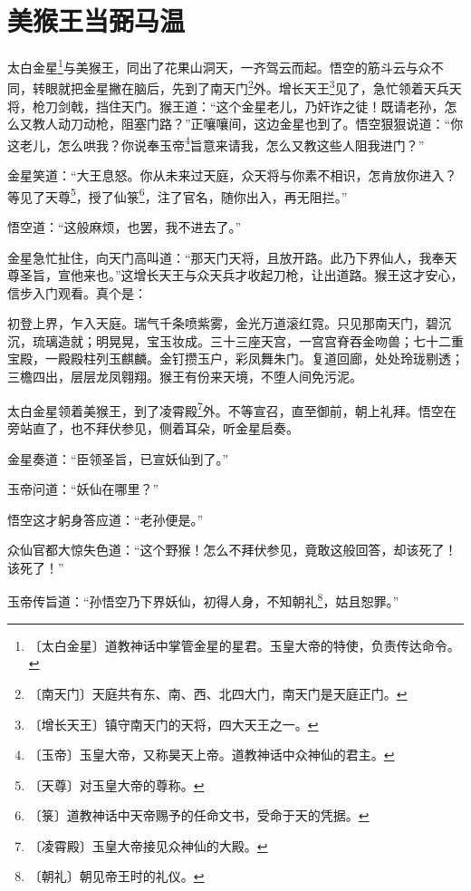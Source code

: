 \documentclass[12pt,UTF-8,openany]{ctexbook}
\begin{document}
\chapter{美猴王当弼马温}

\begin{large}
    
    太白金星\footnote{〔太白金星〕道教神话中掌管金星的星君。玉皇大帝的特使，负责传达命令。}与美猴王，同出了花果山洞天，一齐驾云而起。悟空的筋斗云与众不同，转眼就把金星撇在脑后，先到了南天门\footnote{〔南天门〕天庭共有东、南、西、北四大门，南天门是天庭正门。}外。增长天王\footnote{〔增长天王〕镇守南天门的天将，四大天王之一。}见了，急忙领着天兵天将，枪刀剑戟，挡住天门。猴王道：“这个金星老儿，乃奸诈之徒！既请老孙，怎么又教人动刀动枪，阻塞门路？”正嚷嚷间，这边金星也到了。悟空狠狠说道：“你这老儿，怎么哄我？你说奉玉帝\footnote{〔玉帝〕玉皇大帝，又称昊天上帝。道教神话中众神仙的君主。}旨意来请我，怎么又教这些人阻我进门？”
    
    金星笑道：“大王息怒。你从未来过天庭，众天将与你素不相识，怎肯放你进入？等见了天尊\footnote{〔天尊〕对玉皇大帝的尊称。}，授了仙箓\footnote{〔箓〕道教神话中天帝赐予的任命文书，受命于天的凭据。}，注了官名，随你出入，再无阻拦。”
    
    悟空道：“这般麻烦，也罢，我不进去了。”
    
    金星急忙扯住，向天门高叫道：“那天门天将，且放开路。此乃下界仙人，我奉天尊圣旨，宣他来也。”这增长天王与众天兵才收起刀枪，让出道路。猴王这才安心，信步入门观看。真个是：
    
    初登上界，乍入天庭。瑞气千条喷紫雾，金光万道滚红霓。只见那南天门，碧沉沉，琉璃造就；明晃晃，宝玉妆成。三十三座天宫，一宫宫脊吞金吻兽；七十二重宝殿，一殿殿柱列玉麒麟。金钉攒玉户，彩凤舞朱门。复道回廊，处处玲珑剔透；三檐四出，层层龙凤翱翔。猴王有份来天境，不堕人间免污泥。
    
    太白金星领着美猴王，到了凌霄殿\footnote{〔凌霄殿〕玉皇大帝接见众神仙的大殿。}外。不等宣召，直至御前，朝上礼拜。悟空在旁站直了，也不拜伏参见，侧着耳朵，听金星启奏。
    
    金星奏道：“臣领圣旨，已宣妖仙到了。”
    
    玉帝问道：“妖仙在哪里？”
    
    悟空这才躬身答应道：“老孙便是。”
    
    众仙官都大惊失色道：“这个野猴！怎么不拜伏参见，竟敢这般回答，却该死了！该死了！”
    
    玉帝传旨道：“孙悟空乃下界妖仙，初得人身，不知朝礼\footnote{〔朝礼〕朝见帝王时的礼仪。}，姑且恕罪。”
    

\end{large}
\end{document}
